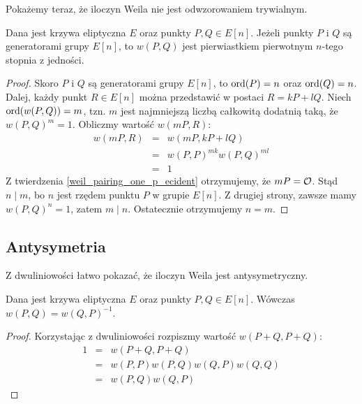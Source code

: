 Pokażemy teraz, że iloczyn Weila nie jest odwzorowaniem trywialnym.

\begin{theorem}
Dana jest krzywa eliptyczna $E$ oraz punkty $P, Q \in E[n]$.
Jeżeli punkty $P$ i $Q$ są generatorami grupy $E[n]$,
to $w(P, Q)$ jest pierwiastkiem pierwotnym $n$-tego stopnia z jedności.
\end{theorem}

\begin{proof}
Skoro $P$ i $Q$ są generatorami grupy $E[n]$,
to $\operatorname{ord}(P) = n$ oraz $\operatorname{ord}(Q) = n$.
Dalej, każdy punkt $R \in E[n]$ można przedstawić w postaci $R = kP + lQ$.
Niech $\operatorname{ord}(w(P,Q)) = m$,
tzn. $m$ jest najmniejszą liczbą całkowitą dodatnią taką,
że $w(P,Q)^m = 1$.
Obliczmy wartość $w(mP, R)$:
\begin{eqnarray*}
w(mP, R)
& = & w(mP, kP + lQ) \\
& = & w(P,P)^{mk}w(P,Q)^{ml} \\
& = & 1
\end{eqnarray*}
Z twierdzenia \ref{weil_pairing_one_p_ecident} otrzymujemy,
że $mP = \mathcal{O}$. Stąd $n \mid m$, bo $n$ jest rzędem punktu $P$
w grupie $E[n]$. Z drugiej strony, zawsze mamy $w(P, Q)^n = 1$,
zatem $m \mid n$. Ostatecznie otrzymujemy $n = m$.
\end{proof}

\subsection*{Antysymetria}

Z dwuliniowości łatwo pokazać, że iloczyn Weila jest antysymetryczny.

\begin{theorem}
Dana jest krzywa eliptyczna $E$ oraz punkty $P, Q \in E[n]$.
Wówczas $w(P, Q) = w(Q, P)^{-1}$.
\end{theorem}

\begin{proof}
Korzystając z dwuliniowości rozpiszmy wartość $w(P + Q, P + Q)$:
\begin{eqnarray*}
1
& = & w(P + Q, P + Q) \\
& = & w(P,P)w(P,Q)w(Q,P)w(Q,Q) \\
& = & w(P, Q)w(Q, P)
\end{eqnarray*}
\end{proof}
